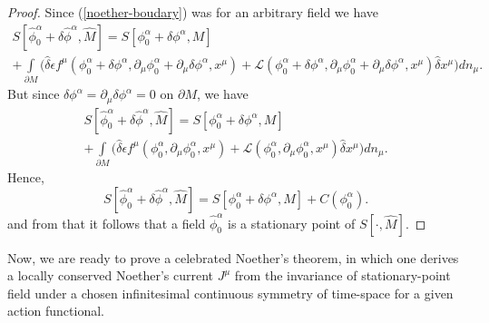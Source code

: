 \documentclass[main.tex]{subfiles}
\begin{document}
\begin{proof}
Since (\ref{noether-boudary}) was for an arbitrary field we have
\begin{multline*}
S[\hat{\phi}_0^\alpha + \delta \hat{\phi}^\alpha, \hat{M}] = S[\phi_0^\alpha + \delta \phi^\alpha, M] 
\\+ \int\limits_{\partial M} \bigg(\hat{\delta}\epsilon f^\mu(\phi_0^\alpha + \delta \phi^\alpha, \partial_\mu \phi_0^\alpha + \partial_\mu \delta \phi^\alpha, x^\mu) +  
\mathcal{L}(\phi_0^\alpha + \delta \phi^\alpha, \partial_\mu \phi_0^\alpha + \partial_\mu \delta \phi^\alpha, x^\mu)\hat{\delta}x^\mu\bigg) dn_\mu.
\end{multline*}
But since $\delta \phi^\alpha = \partial_\mu \delta \phi^\alpha = 0$ on $\partial M$, we have
\begin{multline*}
S[\hat{\phi}_0^\alpha + \delta \hat{\phi}^\alpha, \hat{M}] = S[\phi_0^\alpha + \delta \phi^\alpha, M] 
\\+ \int\limits_{\partial M} \bigg(\hat{\delta}\epsilon f^\mu(\phi_0^\alpha, \partial_\mu \phi_0^\alpha, x^\mu)  +
\mathcal{L}(\phi_0^\alpha, \partial_\mu \phi_0^\alpha, x^\mu)\hat{\delta}x^\mu\bigg) dn_\mu.
\end{multline*}
Hence,
\begin{equation}
S[\hat{\phi}_0^\alpha + \delta \hat{\phi}^\alpha, \hat{M}] = S[\phi_0^\alpha + \delta \phi^\alpha, M] + C(\phi_0^\alpha).
\end{equation}
and from that it follows that
a field $\hat{\phi}_0^\alpha$ is a stationary point of $S[\cdot, \hat{M}]$. 
\end{proof}

Now, we are ready to prove a celebrated Noether's theorem, in which one derives a locally conserved Noether's current $J^\mu$ from the invariance of stationary-point field under a chosen infinitesimal continuous symmetry of time-space for a given action functional.
\end{document}
